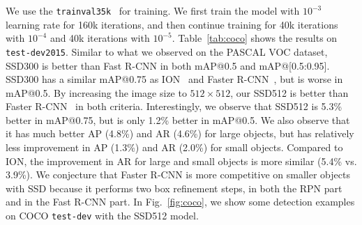 \documentclass[runningheads]{llncs}
\begin{document}
We use the \texttt{trainval35k}~\cite{bell2015inside} for training. We first train the model with $10^{-3}$ learning rate for 160k iterations, and then continue training for 40k iterations with $10^{-4}$ and 40k iterations with $10^{-5}$. Table~\ref{tab:coco} shows the results on \texttt{test-dev2015}. Similar to what we observed on the PASCAL VOC dataset, SSD300 is better than Fast R-CNN in both mAP@0.5 and mAP@[0.5:0.95]. SSD300 has a similar mAP@0.75 as ION~\cite{bell2015inside} and Faster R-CNN~\cite{cocoleaderboard}, but is worse in mAP@0.5.
By increasing the image size to $512\times 512$, our SSD512 is better than Faster R-CNN~\cite{cocoleaderboard} in both criteria. Interestingly, we observe that SSD512 is 5.3\% better in mAP@0.75, but is only 1.2\% better in mAP@0.5. We also observe that it has much better AP (4.8\%) and AR (4.6\%) for large objects, but has relatively less improvement in AP (1.3\%) and AR (2.0\%) for small objects. Compared to ION, the improvement in AR for large and small objects is more similar (5.4\% vs. 3.9\%). We conjecture that Faster R-CNN is more competitive on smaller objects with SSD because it performs two box refinement steps, in both the RPN part and in the Fast R-CNN part. In Fig.~\ref{fig:coco}, we show some detection examples on COCO \texttt{test-dev} with the SSD512 model.

\end{document}
